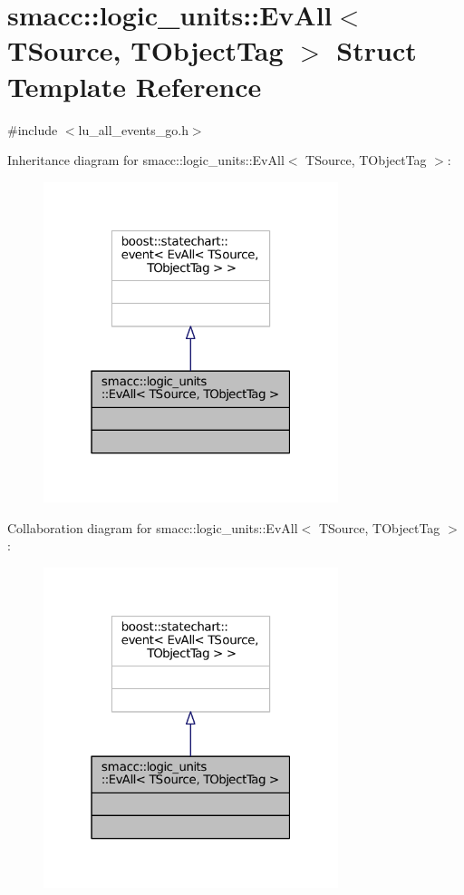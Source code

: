 \hypertarget{structsmacc_1_1logic__units_1_1EvAll}{}\section{smacc\+:\+:logic\+\_\+units\+:\+:Ev\+All$<$ T\+Source, T\+Object\+Tag $>$ Struct Template Reference}
\label{structsmacc_1_1logic__units_1_1EvAll}


{\ttfamily \#include $<$lu\+\_\+all\+\_\+events\+\_\+go.\+h$>$}



Inheritance diagram for smacc\+:\+:logic\+\_\+units\+:\+:Ev\+All$<$ T\+Source, T\+Object\+Tag $>$\+:
\nopagebreak
\begin{figure}[H]
\begin{center}
\leavevmode
\includegraphics[width=244pt]{structsmacc_1_1logic__units_1_1EvAll__inherit__graph}
\end{center}
\end{figure}


Collaboration diagram for smacc\+:\+:logic\+\_\+units\+:\+:Ev\+All$<$ T\+Source, T\+Object\+Tag $>$\+:
\nopagebreak
\begin{figure}[H]
\begin{center}
\leavevmode
\includegraphics[width=244pt]{structsmacc_1_1logic__units_1_1EvAll__coll__graph}
\end{center}
\end{figure}


